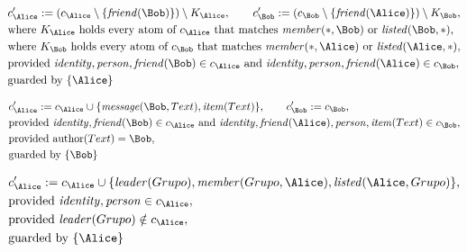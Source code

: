 \begin{align*}
&
c'_
{
\Alice
}
 := 
(c_
{
\Alice
}
 \setminus 
\{
\mathit{\detokenize{
friend
}}
(
\Bob
)
\}
) \setminus K_
{
\Alice
}
, \qquad 
c'_
{
\Bob
}
 := 
(c_
{
\Bob
}
 \setminus 
\{
\mathit{\detokenize{
friend
}}
(
\Alice
)
\}
) \setminus K_
{
\Bob
}
,\\
&
\text{where } K_
{
\Alice
}
 \text{ holds every atom of } c_
{
\Alice
}
 \text{ that matches } 
\mathit{\detokenize{
member
}}
(
\ast
,
\Bob
)
 \text{ or } 
\mathit{\detokenize{
listed
}}
(
\Bob
,
\ast
)
,\\
&
\text{where } K_
{
\Bob
}
 \text{ holds every atom of } c_
{
\Bob
}
 \text{ that matches } 
\mathit{\detokenize{
member
}}
(
\ast
,
\Alice
)
 \text{ or } 
\mathit{\detokenize{
listed
}}
(
\Alice
,
\ast
)
,\\
&
\text{provided } 
\mathit{\detokenize{
identity
}}
,
\mathit{\detokenize{
person
}}
,
\mathit{\detokenize{
friend
}}
(
\Bob
)
 \in c_
{
\Alice
}
 \text{ and } 
\mathit{\detokenize{
identity
}}
,
\mathit{\detokenize{
person
}}
,
\mathit{\detokenize{
friend
}}
(
\Alice
)
 \in c_
{
\Bob
}
,\\
&
\text{guarded by } \{
\Alice
\}
\end{align*}

\begin{align*}
&
c'_
{
\Alice
}
 := 
c_
{
\Alice
}
 \cup 
\{
\mathit{\detokenize{
message
}}
(
\Bob
,
Text
)
,
\mathit{\detokenize{
item
}}
(
Text
)
\}
, \qquad 
c'_
{
\Bob
}
 := 
c_
{
\Bob
}
,\\
&
\text{provided } 
\mathit{\detokenize{
identity
}}
,
\mathit{\detokenize{
friend
}}
(
\Bob
)
 \in c_
{
\Alice
}
 \text{ and } 
\mathit{\detokenize{
identity
}}
,
\mathit{\detokenize{
friend
}}
(
\Alice
)
,
\mathit{\detokenize{
person
}}
,
\mathit{\detokenize{
item
}}
(
Text
)
 \in c_
{
\Bob
}
,\\
&
\text{provided } 
\mathrm{author}(
Text
)
=
\Bob
,\\
&
\text{guarded by } \{
\Bob
\}
\end{align*}

\begin{align*}
&
c'_
{
\Alice
}
 := 
c_
{
\Alice
}
 \cup 
\{
\mathit{\detokenize{
leader
}}
(
Grupo
)
,
\mathit{\detokenize{
member
}}
(
Grupo
,
\Alice
)
,
\mathit{\detokenize{
listed
}}
(
\Alice
,
Grupo
)
\}
,\\
&
\text{provided } 
\mathit{\detokenize{
identity
}}
,
\mathit{\detokenize{
person
}}
 \in c_
{
\Alice
}
,\\
&
\text{provided } 
\mathit{\detokenize{
leader
}}
(
Grupo
)
 \notin c_
{
\Alice
}
,\\
&
\text{guarded by } \{
\Alice
\}
\end{align*}
